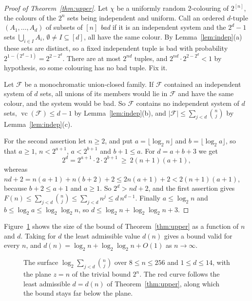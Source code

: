 \documentclass[11pt,reqno]{amsart}
\numberwithin{equation}{section}
\theoremstyle{plain}
\theoremstyle{definition}
\theoremstyle{remark}
\newcommand{\cF}{\mathcal{F}}
\DeclareMathOperator{\vc}{vc}
\begin{document}
\begin{proof}[Proof of Theorem~\ref{thm:upper}]
Let $\chi$ be a uniformly random $2$-colouring of $2^{[n]}$, the colours
of the $2^{n}$ sets being independent and uniform. Call an ordered
$d$-tuple $(A_1,\dots,A_d)$ of subsets of $[n]$ \emph{bad} if it is an
independent system and the $2^{d}-1$ sets $\bigcup_{i\in I}A_i$,
$\emptyset\ne I\subseteq[d]$, all have the same colour. By
Lemma~\ref{lem:indep}(a) these sets are distinct, so a fixed independent
tuple is bad with probability $2^{1-(2^d-1)}=2^{2-2^{d}}$. There are at
most $2^{nd}$ tuples, and $2^{nd}\cdot2^{2-2^{d}}<1$ by hypothesis, so
some colouring has no bad tuple. Fix it.

Let $\cF$ be a monochromatic union-closed family. If $\cF$ contained an
independent system of $d$ sets, all unions of its members would lie in
$\cF$ and have the same colour, and the system would be bad. So $\cF$
contains no independent system of $d$ sets, $\vc(\cF)\le d-1$ by
Lemma~\ref{lem:indep}(b), and $|\cF|\le\sum_{j<d}\binom nj$ by
Lemma~\ref{lem:indep}(c).

For the second assertion let $n\ge2$, and put $a=\lfloor\log_2n\rfloor$
and $b=\lfloor\log_2a\rfloor$, so that $a\ge1$, $n<2^{a+1}$, $a<2^{b+1}$
and $b+1\le a$. For $d=a+b+3$ we get
\[
2^{d}=2^{a+1}\cdot2\cdot2^{b+1}\ \ge\ 2(n+1)(a+1),
\]
whereas $nd+2=n(a+1)+n(b+2)+2\le2n(a+1)+2<2(n+1)(a+1)$, because
$b+2\le a+1$ and $a\ge1$. So $2^{d}>nd+2$, and the first assertion gives
$F(n)\le\sum_{j<d}\binom nj\le\sum_{j<d}n^{j}\le d\,n^{d-1}$. Finally
$a\le\log_2n$ and $b\le\log_2a\le\log_2\log_2n$, so $d\le\log_2n+
\log_2\log_2n+3$.
\end{proof}

Figure~\ref{fig:surface} shows the size of the bound of
Theorem~\ref{thm:upper} as a function of $n$ and $d$. Taking for $d$ the
least admissible value $d(n)$ gives a bound valid for every $n$, and
$d(n)=\log_2n+\log_2\log_2n+O(1)$ as $n\to\infty$.

\begin{figure}[t]
\centering

\caption{The surface $\log_2\sum_{j<d}\binom nj$ over $8\le n\le256$ and
$1\le d\le14$, with the plane $z=n$ of the trivial bound $2^{n}$. The red
curve follows the least admissible $d=d(n)$ of Theorem~\ref{thm:upper},
along which the bound stays far below the plane.}
\label{fig:surface}
\end{figure}
\end{document}
